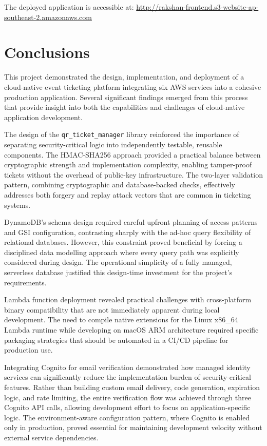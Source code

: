 \documentclass[conference]{IEEEtran}
\begin{document}
The deployed application is accessible at: \url{http://rakshan-frontend.s3-website-ap-southeast-2.amazonaws.com}

\section{Conclusions}

This project demonstrated the design, implementation, and deployment of a cloud-native event ticketing platform integrating six AWS services into a cohesive production application. Several significant findings emerged from this process that provide insight into both the capabilities and challenges of cloud-native application development.

The design of the \texttt{qr\_ticket\_manager} library reinforced the importance of separating security-critical logic into independently testable, reusable components. The HMAC-SHA256 approach provided a practical balance between cryptographic strength and implementation complexity, enabling tamper-proof tickets without the overhead of public-key infrastructure. The two-layer validation pattern, combining cryptographic and database-backed checks, effectively addresses both forgery and replay attack vectors that are common in ticketing systems.

DynamoDB's schema design required careful upfront planning of access patterns and GSI configuration, contrasting sharply with the ad-hoc query flexibility of relational databases. However, this constraint proved beneficial by forcing a disciplined data modelling approach where every query path was explicitly considered during design. The operational simplicity of a fully managed, serverless database justified this design-time investment for the project's requirements.

Lambda function deployment revealed practical challenges with cross-platform binary compatibility that are not immediately apparent during local development. The need to compile native extensions for the Linux x86\_64 Lambda runtime while developing on macOS ARM architecture required specific packaging strategies that should be automated in a CI/CD pipeline for production use.

Integrating Cognito for email verification demonstrated how managed identity services can significantly reduce the implementation burden of security-critical features. Rather than building custom email delivery, code generation, expiration logic, and rate limiting, the entire verification flow was achieved through three Cognito API calls, allowing development effort to focus on application-specific logic. The environment-aware configuration pattern, where Cognito is enabled only in production, proved essential for maintaining development velocity without external service dependencies.
\end{document}
